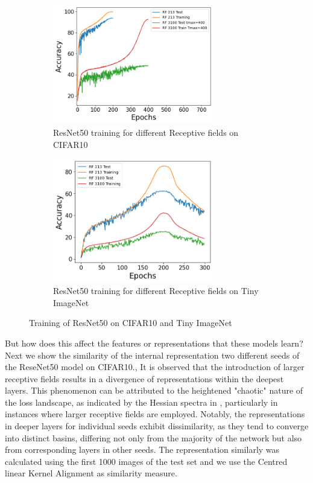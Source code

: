 \begin{figure}[H]
  \begin{subfigure}[b]{0.45\textwidth}
      \centering
      \includegraphics[width=7cm]{images/resnet50_CIFAR10_training.png}
      \caption{ResNet50 training for different Receptive fields on CIFAR10}
      \label{fig:images-resnet50_CIFAR10_training-png}
    \end{subfigure}
    \hfill
    \begin{subfigure}[b]{0.45\textwidth}
      \centering
      \includegraphics[width=7cm]{images/resnet50_Tiny_imagenet_training.png}
      \caption{ResNet50 training for different Receptive fields on Tiny ImageNet}
      \label{fig:images-resnet50_Tiny_imagenet_training-png}
    \end{subfigure}
     \caption{Training of ResNet50 on CIFAR10 and Tiny ImageNet}
     \label{fig:training_trajectories}

\end{figure}
But how does this affect the features or representations that these models learn? Next we show the similarity of the
internal representation two different seeds of the ReseNet50 model on CIFAR10., It is observed that the introduction of
larger receptive fields results in a divergence of representations within the deepest layers. This phenomenon can be
attributed to the heightened "chaotic" nature of the loss landscape, as indicated by the Hessian spectra in , particularly in instances where larger receptive fields are employed. Notably, the
representations in deeper layers for individual seeds exhibit dissimilarity, as they tend to converge into distinct
basins, differing not only from the majority of the network but also from corresponding layers in other seeds. The representation
 similarly was calculated using the first 1000 images of the test set and we use the Centred linear Kernel Alignment
 \citep{kornblithSimilarityNeuralNetwork2019} as similarity measure.




